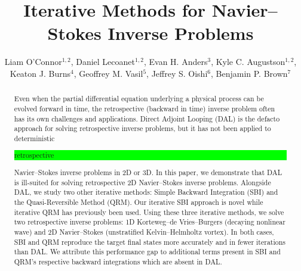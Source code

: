 \documentclass[%
 reprint,
 amsmath,amssymb,
 aps,
 pre,
]{revtex4-2}
\newcommand{\hly}[1]{\colorbox{lime}{\parbox{\columnwidth}{#1}}}
\begin{document}

\title{Iterative Methods for Navier--Stokes Inverse Problems}

\author{Liam O'Connor$^{1,2}$, Daniel Lecoanet$^{1,2}$, Evan H. Anders$^{3}$, Kyle C. Augustson$^{1,2}$, Keaton J. Burns$^{4}$, Geoffrey M. Vasil$^{5}$, Jeffrey S. Oishi$^{6}$, Benjamin P. Brown$^{7}$}

\address{$^1$Department of Engineering Sciences and Applied Mathematics, Northwestern University, Evanston, IL, 60208 USA}
\address{$^2$Center for Interdisciplinary Exploration and Research in Astrophysics, Northwestern University, Evanston, IL, 60201 USA}
\address{$^3$Kavli Institute for Theoretical Physics, University of California Santa Barbara, Santa Barbara, CA, 93106 USA}
\address{$^4$Department of Mathematics, Massachusetts Institute of Technology, Cambridge, MA, 02142 USA}
\address{$^5$School of Mathematics, Edinburgh University, EH9 3FD, UK}
\address{$^6$Department of Physics and Astronomy, Bates College, Lewiston, ME, 04240 USA}
\address{$^7$Department of Astrophysical and Planetary Sciences, University of Colorado Boulder, Boulder, CO, 80309 USA}

\begin{abstract}
  Even when the partial differential equation underlying a physical process can be evolved forward in time, the retrospective (backward in time) inverse problem often has its own challenges and applications.
  Direct Adjoint Looping (DAL) is the defacto approach for solving retrospective inverse problems, but it has not been applied to deterministic \hly{retrospective} Navier--Stokes inverse problems in 2D or 3D.
  In this paper, we demonstrate that DAL is ill-suited for solving retrospective 2D Navier--Stokes inverse problems. 
  Alongside DAL, we study two other iterative methods: Simple Backward Integration (SBI) and the Quasi-Reversible Method (QRM).
  Our iterative SBI approach is novel while iterative QRM has previously been used.
  Using these three iterative methods, we solve two retrospective inverse problems:
  1D Korteweg--de Vries--Burgers (decaying nonlinear wave) and 2D Navier--Stokes (unstratified Kelvin--Helmholtz vortex).
  In both cases, SBI and QRM reproduce the target final states more accurately and in fewer iterations than DAL.
  We attribute this performance gap to additional terms present in SBI and QRM's respective backward integrations which are absent in DAL.
\end{abstract}
\end{document}
